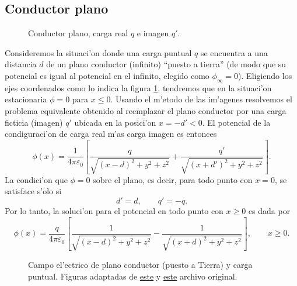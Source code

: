 \subsection{Conductor plano}
\begin{figure}[!h]
\centerline{}
\caption{Conductor plano, carga real $q$ e imagen $q'$.}
\label{ci01}
\end{figure}
Consideremos la situaci'on donde una carga puntual $q$ se encuentra a una distancia $d$ de un plano conductor (infinito) ``puesto a tierra'' (de modo que su potencial es igual al potencial en el infinito, elegido como $\phi_\infty=0$). Eligiendo los ejes coordenados como lo indica la figura \ref{ci01}, tendremos que en la situaci'on estacionaria $\phi=0$ para $x\le 0$. Usando el m'etodo de las im'agenes resolvemos el problema equivalente obtenido al reemplazar el plano conductor por una carga ficticia (imagen) $q'$ ubicada en la posici'on $x=-d'<0$. El potencial de la condiguraci'on de carga real m'as carga imagen es entonces
\begin{equation}
 \phi(x)=\frac{1}{4\pi\varepsilon_0}\left[\frac{q}{\sqrt{(x-d)^2+y^2+z^2}}+\frac
{q'}{\sqrt{(x+d')^2+y^2+z^2}}\right].
\end{equation}
La condici'on que $\phi=0$ sobre el plano, es decir, para todo punto con $x=0$,
se satisface s'olo si
\begin{equation}
 d'=d, \qquad q'=-q.
\end{equation}
Por lo tanto, la soluci'on para el potencial en todo punto con $x\ge 0$ es dada por
\begin{equation}
 \phi(x)=\frac{q}{4\pi\varepsilon_0}\left[\frac{1}{\sqrt{(x-d)^2+y^2+z^2}}-\frac
{1}{\sqrt{(x+d)^2+y^2+z^2}}\right], \qquad x\ge 0.
\end{equation}
\begin{center}
\begin{figure}[H]
\centerline{
\hspace{2cm}}
\caption{Campo el'ectrico de plano conductor (puesto a Tierra) y carga puntual. 
Figuras adaptadas de  \href{http://commons.wikimedia.org/wiki/File:VFPt_image_charge_plane_horizontal.svg}{este} y \href{http://commons.wikimedia.org/wiki/File:VFPt_image_charge_plane.svg}{este} archivo original.}
\label{fig:pyc}
\end{figure}
\end{center}

